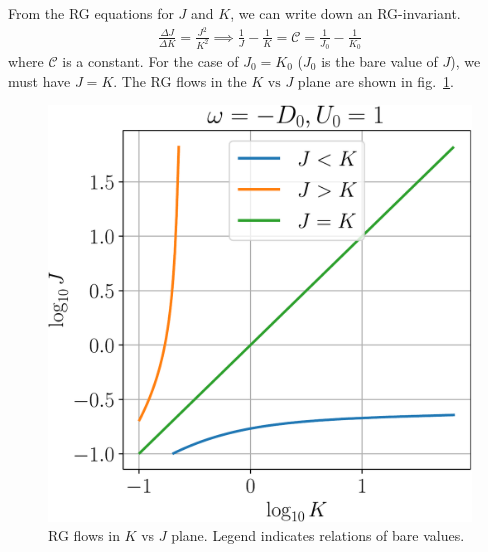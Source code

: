 \documentclass[twoside]{report}
\numberwithin{equation}{section}
\begin{document}
From the RG equations for \(J\) and \(K\), we can write down an RG-invariant.
\begin{equation}\begin{aligned}
	\label{rginv}
	\frac{\Delta J}{\Delta K} = \frac{J^2}{K^2} \implies \frac{1}{J} - \frac{1}{K} = \mathcal{C} = \frac{1}{J_0} - \frac{1}{K_0}
\end{aligned}\end{equation}
where \(\mathcal{C}\) is a constant. For the case of \(J_0 = K_0\) (\(J_0\) is the bare value of \(J\)), we must have \(J=K\). The RG flows in the \(K \text{ vs } J\) plane are shown in fig.~\ref{JvsK}.
\begin{figure}[htpb]
	\centering
	\includegraphics[scale=0.4]{../figures/JvsK.pdf}
	\caption{RG flows in \(K\) vs \(J\) plane. Legend indicates relations of bare values.}
	\label{JvsK}
\end{figure}
\end{document}
